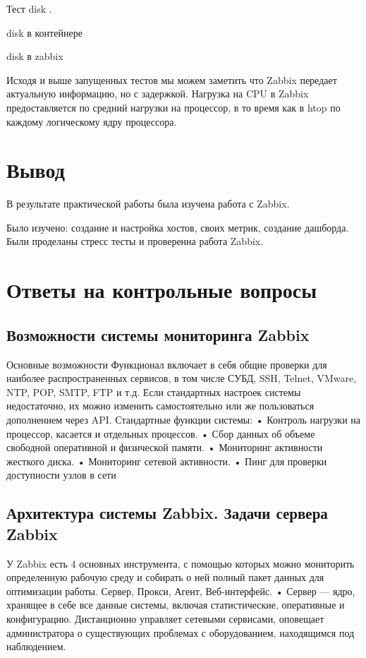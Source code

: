 \clearpage

Тест disk .

\begin{image}
    \caption{disk в контейнере}
    \label{fig:stress_disk}
\end{image}

\begin{image}
    \caption{disk в zabbix}
    \label{fig:stress_zabbix_disk}
\end{image}


Исходя и выше запущенных тестов мы можем заметить что Zabbix передает актуальную информацию, но с задержкой.
Нагрузка на CPU в Zabbix предоставляется по средний нагрузки на процессор, в то время как в htop по каждому логическому
ядру процессора.

\clearpage

\section*{\LARGE Вывод}
В результате практической работы была изучена работа
с Zabbix.\par
Было изучено: создание и настройка хостов, своих метрик, создание дашборда.
Были проделаны стресс тесты и проверенна работа Zabbix.

\clearpage

\section{Ответы на контрольные вопросы}
\subsection{Возможности системы мониторинга Zabbix}
Основные возможности
Функционал включает в себя общие проверки для наиболее распространенных
сервисов, в том числе СУБД, SSH, Telnet, VMware, NTP, POP, SMTP, FTP и
т.д. Если стандартных настроек системы недостаточно, их можно изменить
самостоятельно или же пользоваться дополнением через API.
Стандартные функции системы:
• Контроль нагрузки на процессор, касается и отдельных процессов.
• Сбор данных об объеме свободной оперативной и физической памяти.
• Мониторинг активности жесткого диска.
• Мониторинг сетевой активности.
• Пинг для проверки доступности узлов в сети

\subsection{Архитектура системы Zabbix. Задачи сервера Zabbix}
У Zabbix есть 4 основных инструмента, с помощью которых можно
мониторить определенную рабочую среду и собирать о ней полный пакет
данных для оптимизации работы.
Сервер, Прокси, Агент, Веб-интерфейс.
• Сервер — ядро, хранящее в себе все данные системы, включая
статистические, оперативные и конфигурацию. Дистанционно управляет
сетевыми сервисами, оповещает администратора о существующих проблемах
с оборудованием, находящимся под наблюдением.
